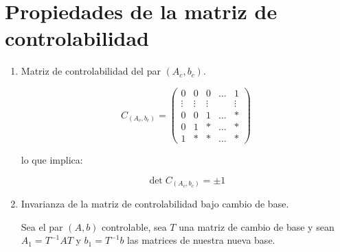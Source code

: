 
    \newpage
    \section{Propiedades de la matriz de controlabilidad}

        \begin{enumerate}
            \item Matriz de controlabilidad del par $(A_c, b_c)$.

                \begin{equation}
                    C_{(A_c,b_c)} =
                    \begin{pmatrix}
                    0 & 0 & 0 & \dots & 1 \\
                    \vdots & \vdots & \vdots & & \vdots \\
                    0 & 0 & 1 & \dots & * \\
                    0 & 1 & * & \dots & * \\
                    1 & * & * & \dots & *
                    \end{pmatrix}
                \end{equation}

                lo que implica:

                \begin{equation}
                    \det{C_{(A_c, b_c)}} = \pm 1
                \end{equation}

            \item Invarianza de la matriz de controlabilidad bajo cambio de base.

                Sea el par $(A, b)$ controlable, sea $T$ una matriz de cambio de base y sean $A_1 = T^{-1} A T$ y $b_1 = T^{-1} b$ las matrices de nuestra nueva base.


\end{enumerate}
